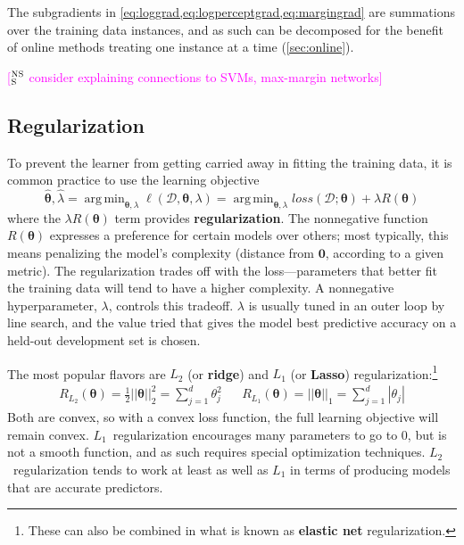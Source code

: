 \documentclass[11pt,letterpaper]{article}
\DeclareMathOperator*{\argmin}{arg\,min}
\newcommand{\ensuretext}[1]{#1}
\newcommand{\nssmarker}{\ensuretext{\textcolor{magenta}{\ensuremath{^{\textsc{NS}}_{\textsc{S}}}}}}
\newcommand{\arkcomment}[3]{\ensuretext{\textcolor{#3}{[#1 #2]}}}
\newcommand{\nss}[1]{\arkcomment{\nssmarker}{#1}{magenta}}
\begin{document}
The subgradients in \cref{eq:loggrad,eq:logperceptgrad,eq:margingrad} 
are summations over the training data instances, and as such can be decomposed 
for the benefit of online methods treating one instance at a time (\cref{sec:online}).

\nss{consider explaining connections to SVMs, max-margin networks}

\subsection{Regularization}

To prevent the learner from getting carried away in fitting the training data, 
it is common practice to use the learning objective
\begin{equation}
\hat{\boldsymbol{\theta}}, \hat{\lambda} = \argmin_{\boldsymbol{\theta}, \lambda}\ell(\mathcal{D}, \boldsymbol{\theta}, \lambda) = \argmin_{\boldsymbol{\theta}, \lambda}\textit{loss}(\mathcal{D}; \boldsymbol{\theta}) + \lambda R(\boldsymbol{\theta})
\end{equation} 
where the $\lambda R(\boldsymbol{\theta})$ term provides \textbf{regularization}.
The nonnegative function $R(\boldsymbol{\theta})$ expresses a preference for certain models over others; 
most typically, this means penalizing the model's complexity (distance from $\mathbf{0}$, according to a given metric).
The regularization trades off with the loss---parameters that better fit the training data will tend to have a higher complexity. 
A nonnegative hyperparameter, $\lambda$, controls this tradeoff. 
$\lambda$ is usually tuned in an outer loop by line search, 
and the value tried that gives the model best predictive accuracy on a held-out development set is chosen.

The most popular flavors are $L_2$ (or \textbf{ridge}) and $L_1$ (or \textbf{Lasso}) regularization:\footnote{These can also be combined in what is known as \textbf{elastic net} regularization.}
\begin{eqnarray}
R_{L_2}(\boldsymbol{\theta}) = \tfrac{1}{2} ||\boldsymbol{\theta}||^2_2 = \sum_{j=1}^d \theta^2_j &&
R_{L_1}(\boldsymbol{\theta}) = ||\boldsymbol{\theta}||_1 = \sum_{j=1}^d |\theta_j|
\end{eqnarray}
Both are convex, so with a convex loss function, the full learning objective will remain convex.
$L_1$~regularization encourages many parameters to go to 0, but is not a smooth function, 
and as such requires special optimization techniques.
$L_2$~regularization tends to work at least as well as $L_1$ in terms of producing models
that are accurate predictors.
\end{document}
